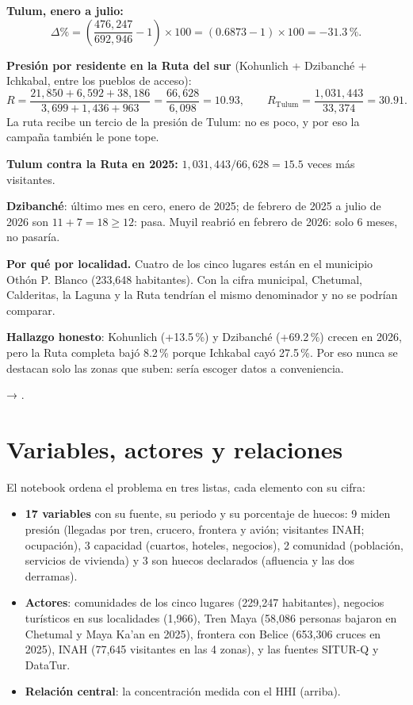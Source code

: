 \begin{amano}
\textbf{Tulum, enero a julio:}
\[\Delta\%=\left(\frac{476{,}247}{692{,}946}-1\right)\times100=(0.6873-1)\times100=-31.3\,\% .\]

\textbf{Presión por residente en la Ruta del sur} (Kohunlich + Dzibanché + Ichkabal, entre los pueblos de acceso):
\[R=\frac{21{,}850+6{,}592+38{,}186}{3{,}699+1{,}436+963}=\frac{66{,}628}{6{,}098}=10.93,\qquad
R_{\text{Tulum}}=\frac{1{,}031{,}443}{33{,}374}=30.91 .\]
La ruta recibe un tercio de la presión de Tulum: no es poco, y por eso la campaña también le pone tope.

\textbf{Tulum contra la Ruta en 2025:} $1{,}031{,}443/66{,}628=15.5$ veces más visitantes.

\textbf{Dzibanché}: último mes en cero, enero de 2025; de febrero de 2025 a julio de 2026 son $11+7=18\ge12$: pasa.
Muyil reabrió en febrero de 2026: solo 6 meses, no pasaría.
\end{amano}

\textbf{Por qué por localidad.} Cuatro de los cinco lugares están en el municipio Othón P. Blanco (233,648 habitantes).
Con la cifra municipal, Chetumal, Calderitas, la Laguna y la Ruta tendrían el mismo denominador y no se podrían comparar.

\textbf{Hallazgo honesto}: Kohunlich (+13.5\,\%) y Dzibanché (+69.2\,\%) crecen en 2026, pero la Ruta completa bajó 8.2\,\%
porque Ichkabal cayó 27.5\,\%. Por eso nunca se destacan solo las zonas que suben: sería escoger datos a conveniencia.

\begin{codigoen} → .\end{codigoen}

\section{Variables, actores y relaciones}
El notebook  ordena el problema en tres listas, cada elemento con su cifra:
\begin{itemize}
\item \textbf{17 variables} con su fuente, su periodo y su porcentaje de huecos: 9 miden presión (llegadas por tren,
  crucero, frontera y avión; visitantes INAH; ocupación), 3 capacidad (cuartos, hoteles, negocios), 2 comunidad
  (población, servicios de vivienda) y 3 son huecos declarados (afluencia y las dos derramas).
\item \textbf{Actores}: comunidades de los cinco lugares (229,247 habitantes), negocios turísticos en sus localidades
  (1,966), Tren Maya (58,086 personas bajaron en Chetumal y Maya Ka'an en 2025), frontera con Belice (653,306 cruces en
  2025), INAH (77,645 visitantes en las 4 zonas), y las fuentes SITUR-Q y DataTur.
\item \textbf{Relación central}: la concentración medida con el HHI (arriba).
\end{itemize}
